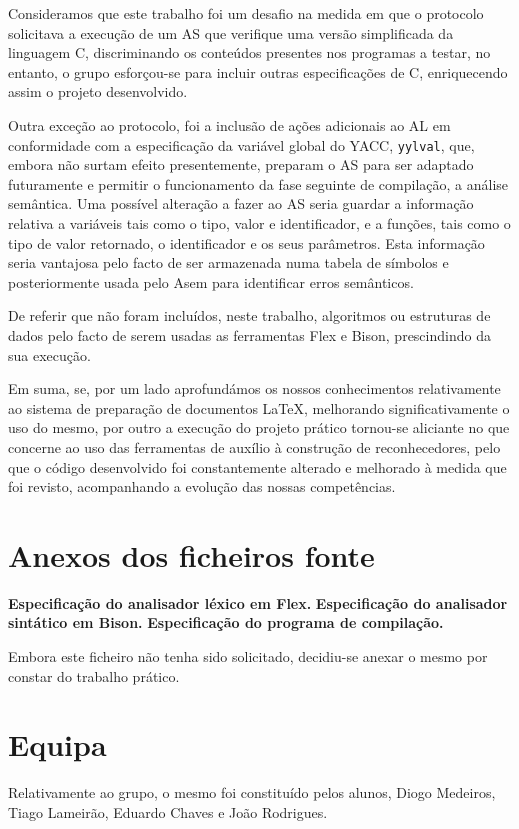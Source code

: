 \documentclass{report}
\begin{document}
Consideramos que este trabalho foi um desafio na medida em que o protocolo solicitava a execução de um AS que verifique uma versão simplificada da linguagem C, discriminando os conteúdos presentes nos programas a testar, no entanto, o grupo esforçou-se para incluir outras especificações de C, enriquecendo assim o projeto desenvolvido.

Outra exceção ao protocolo, foi a inclusão de ações adicionais ao AL em conformidade com a especificação da variável global do YACC, \texttt{yylval}, que, embora não surtam efeito presentemente, preparam o   AS para ser adaptado futuramente e permitir o funcionamento da fase seguinte de compilação, a análise semântica. Uma possível alteração a fazer ao AS seria guardar a informação relativa a variáveis tais como o tipo, valor e identificador, e a funções, tais como o tipo de valor retornado, o identificador e os seus parâmetros. Esta informação seria vantajosa pelo facto de ser armazenada numa tabela de símbolos e posteriormente usada pelo Asem para identificar erros semânticos. 

De referir que não foram incluídos, neste trabalho, algoritmos ou estruturas de dados pelo facto de serem usadas as ferramentas Flex e Bison, prescindindo da sua execução.

Em suma, se, por um lado aprofundámos os nossos conhecimentos relativamente ao sistema de preparação de documentos \LaTeX, melhorando significativamente o uso do mesmo, por outro a execução do projeto prático tornou-se aliciante no que concerne ao uso das ferramentas de auxílio à construção de reconhecedores, pelo que o código desenvolvido foi constantemente alterado e melhorado à medida que foi revisto, acompanhando a evolução das nossas competências.
 
\appendix
\chapter{Anexos dos ficheiros fonte}
\textbf{Especificação do analisador léxico em Flex.}
\textbf{Especificação do analisador sintático em Bison.}
\textbf{Especificação do programa de compilação.}

Embora este ficheiro não tenha sido solicitado, decidiu-se anexar o mesmo por constar do trabalho prático.
\chapter{Equipa}
Relativamente ao grupo, o mesmo foi constituído pelos alunos, Diogo Medeiros, Tiago Lameirão, Eduardo Chaves e João Rodrigues.
\end{document}
